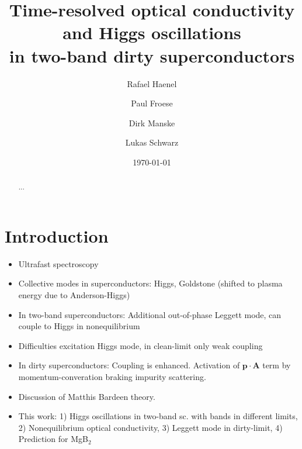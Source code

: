 \documentclass[aps,prb,reprint,noeprint,superscriptaddress]{revtex4-1}
\begin{document}
\title{Time-resolved optical conductivity and Higgs oscillations\\in two-band dirty superconductors}

\author{Rafael Haenel}

\author{Paul Froese}


\author{Dirk Manske}

\author{Lukas Schwarz}


\date{\today}

\begin{abstract}
...
\end{abstract}




\maketitle


\section{Introduction}
\label{sec:introduction}

\begin{itemize}
	\item Ultrafast spectroscopy
	\item Collective modes in superconductors: Higgs, Goldstone (shifted to plasma energy due to Anderson-Higgs)
	\item In two-band superconductors: Additional out-of-phase Leggett mode, can couple to Higgs in nonequilibrium
	\item Difficulties excitation Higgs mode, in clean-limit only weak coupling
	\item In dirty superconductors: Coupling is enhanced. Activation of
		$\mathbf{p} \cdot \mathbf{A}$ term by momentum-converation
		braking impurity scattering.
	\item Discussion of Matthis Bardeen theory.
	\item This work: 1) Higgs oscillations in two-band sc. with bands in different limits, 2) Nonequilibrium optical conductivity, 3) Leggett mode in dirty-limit, 4) Prediction for MgB$_2$
\end{itemize}
\end{document}
